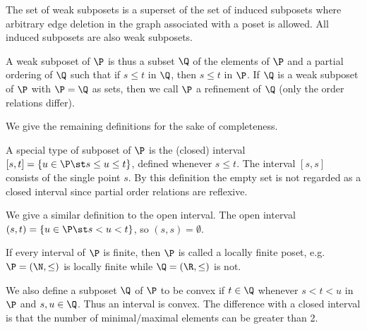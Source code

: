 The set of weak subposets is a superset of the set of induced subposets where
arbitrary edge deletion in the graph associated with a poset is allowed.
All induced subposets are also weak subposets.
\begin{definition}
A weak subposet of $\P$ is thus a subset $\Q$ of the elements of $\P$ and a
partial ordering of $\Q$ such that if $s \leq t$ in $\Q$, then $s \leq t$ in $\P$.
If $\Q$ is a weak subposet of $\P$ with $\P = \Q$ as sets, then we call $\P$ a
refinement of $\Q$ (only the order relations differ).
\end{definition}

We give the remaining definitions for the sake of completeness.
\begin{definition}
A special type of subposet of $\P$ is the (closed) interval $[s, t] = \left\{{u
\in \P \st s \leq u \leq t}\right\}$, defined whenever $s \leq t$. The interval
$[s, s]$ consists of the single point $s$.
By this definition the empty set is not regarded as a closed interval since
partial order relations are reflexive.
\end{definition}
\begin{definition}
We give a similar definition to the open interval.
The open interval $(s, t) = \left\{{u \in \P \st s < u <
t}\right\}$, so $(s, s) = \emptyset$.
\end{definition}
\begin{definition}
If every interval of $\P$ is finite, then $\P$ is called a locally finite poset,
e.g. $\P = (\N, \le)$ is locally finite while $\Q = (\R, \le)$ is
not.
\end{definition}
\begin{definition}
We also define a subposet $\Q$ of $\P$ to be convex if $t \in \Q$ whenever $s < t
< u$ in $\P$ and $s, u \in \Q$. Thus an interval is convex. The difference with a
closed interval is that the number of minimal/maximal elements can be greater than 2.
\end{definition}

